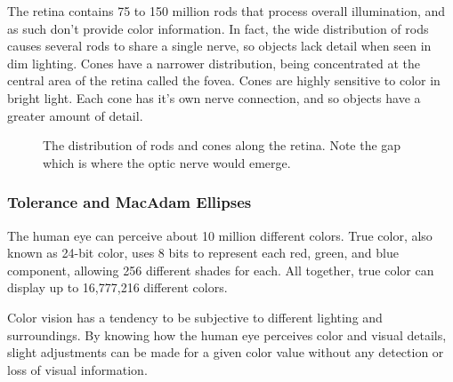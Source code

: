 \documentclass[12pt]{CPP}
\begin{document}
The retina contains 75 to 150 million rods that process overall illumination, and as such don't provide color information. In fact, the wide distribution of rods causes several rods to share a single nerve, so objects lack detail when seen in dim lighting. Cones have a narrower distribution, being concentrated at the central area of the retina called the fovea. Cones are highly sensitive to color in bright light. Each cone has it's own nerve connection, and so objects have a greater amount of detail. \citep{Rafael}

\begin{figure}[!htbp]
\begin{center}
\caption{The distribution of rods and cones along the retina. Note the gap which is where the optic nerve would emerge.}
\end{center}
\end{figure}

\subsubsection{Tolerance and MacAdam Ellipses}
The human eye can perceive about 10 million different colors. True color, also known as 24-bit color, uses 8 bits to represent each red, green, and blue component, allowing 256 different shades for each. All together, true color can display up to 16,777,216 different colors.

Color vision has a tendency to be subjective to different lighting and surroundings. By knowing how the human eye perceives color and visual details, slight adjustments can be made for a given color value without any detection or loss of visual information. \citep{MacAdam}
\end{document}
